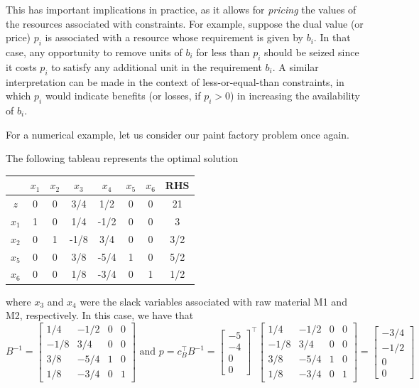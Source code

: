This has important implications in practice, as it allows for \textit{pricing} the values of the resources associated with constraints. For example, suppose the dual value (or price) $p_i$ is associated with a resource whose requirement is given by $b_i$. In that case, any opportunity to remove units of $b_i$ for less than $p_i$ should be seized since it costs $p_i$ to satisfy any additional unit in the requirement $b_i$. A similar interpretation can be made in the context of less-or-equal-than constraints, in which $p_i$ would indicate benefits (or losses, if $p_i > 0$) in increasing the availability of $b_i$. 

For a numerical example, let us consider our paint factory problem once again. 


The following tableau represents the optimal solution
%
\begin{center}
	\begin{tabular}{c|cccccc|c}
		     & $x_1$ & $x_2$ & $x_3$ & $x_4$ & $x_5$ & $x_6$ & RHS \\ \hline 
		$z$  & 0  & 0 & 3/4 & 1/2 & 0 & 0 & 21   \\ \hline
	   $x_1$ & 1  & 0 & 1/4 & -1/2 & 0 & 0 & 3 \\
	   $x_2$ & 0  & 1 &-1/8 & 3/4 & 0 & 0 & 3/2  \\
	   $x_5$ & 0  & 0 & 3/8 &-5/4 & 1 & 0 & 5/2  \\
	   $x_6$ & 0  & 0 & 1/8 &-3/4 & 0 & 1 & 1/2  \\ \hline
	\end{tabular}
\end{center}
%
where $x_3$ and $x_4$ were the slack variables associated with raw material M1 and M2, respectively. In this case, we have that 
$$
B^{-1} = \begin{bmatrix}
 		   1/4 & -1/2 & 0 & 0 \\
		  -1/8 & 3/4 & 0 & 0 \\
		   3/8 &-5/4 & 1 & 0 \\
		   1/8 &-3/4 & 0 & 1
 		 \end{bmatrix} \text{ and } p = c_B^\top B^{-1} =  
 		 \begin{bmatrix}
 		 	-5 \\
 		 	-4 \\
 		 	0 \\
 		 	0
 		 \end{bmatrix}^\top
 		 \begin{bmatrix}
 		   1/4 & -1/2 & 0 & 0 \\
		  -1/8 & 3/4 & 0 & 0 \\
		   3/8 &-5/4 & 1 & 0 \\
		   1/8 &-3/4 & 0 & 1
 		 \end{bmatrix}  = 
 		 \begin{bmatrix}
 		 	-3/4 \\ -1/2 \\ 0 \\ 0
 		 \end{bmatrix}
$$
